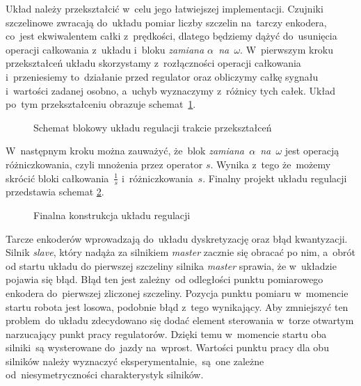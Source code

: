 \documentclass[11pt]{article}
\begin{document}
Układ należy przekształcić w~celu jego łatwiejszej implementacji.
Czujniki szczelinowe zwracają do~układu pomiar liczby szczelin na~tarczy enkodera, co~jest ekwiwalentem całki z~prędkości, dlatego będziemy dążyć do~usunięcia operacji całkowania z~układu i~bloku \textit{zamiana $ \alpha $~na~$ \omega  $}.
W~pierwszym kroku przekształceń układu skorzystamy z~rozłączności operacji całkowania i~przeniesiemy to~działanie przed regulator oraz obliczymy całkę sygnału i~wartości zadanej osobno, a~uchyb wyznaczymy z~różnicy tych całek.
Układ po~tym przekształceniu obrazuje schemat~\ref{fig:tikz:control_block_2}.
\begin{figure}[htbp]
	\centering
	
	\caption{Schemat blokowy układu regulacji trakcie przekształceń}
	\label{fig:tikz:control_block_2}
\end{figure}
W~następnym kroku można zauważyć, że~blok \textit{zamiana~$ \alpha $~na~$ \omega $} jest operacją różniczkowania, czyli mnożenia przez operator $ s $. Wynika z~tego że~możemy skrócić bloki całkowania~$ \frac{1}{s} $ i~różniczkowania~$ s $.
Finalny projekt układu regulacji przedstawia schemat \ref{fig:tikz:control_block_3}.
\begin{figure}
	\centering
	
	\caption{Finalna konstrukcja układu regulacji}
	\label{fig:tikz:control_block_3}
\end{figure}
Tarcze enkoderów wprowadzają do~układu dyskretyzację oraz błąd kwantyzacji.
Silnik \textit{slave}, który nadąża za silnikiem \textit{master} zacznie się obracać po nim, a~obrót od startu układu do pierwszej szczeliny silnika \textit{master} sprawia, że w~układzie pojawia się błąd.
Błąd ten jest zależny~od odległości punktu pomiarowego enkodera do~pierwszej zliczonej szczeliny.
Pozycja punktu pomiaru w~momencie startu robota jest losowa, podobnie błąd z~tego wynikający.
Aby zmniejszyć ten problem~do układu zdecydowano się dodać element sterowania w~torze otwartym narzucający punkt pracy regulatorów.
Dzięki temu w~momencie startu oba silniki~są wysterowane do~jazdy na~wprost.
Wartości punktu pracy dla obu silników należy wyznaczyć eksperymentalnie,~są~one zależne od~niesymetryczności charakterystyk silników.
\end{document}
